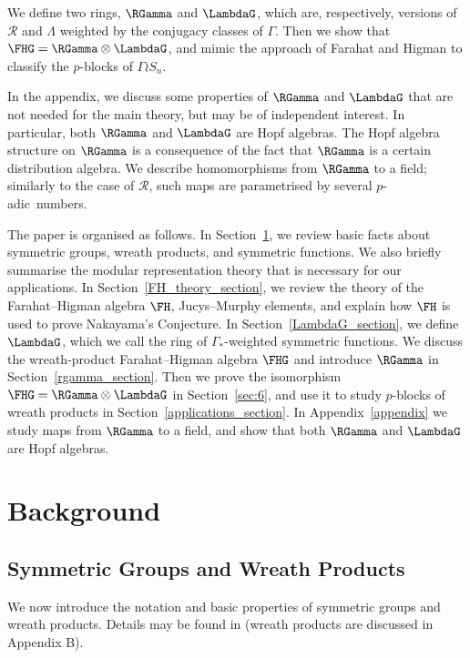 We define two rings, $\RGamma$ and $\LambdaG$, which are, respectively, versions of $\mathcal{R}$ and $\Lambda$ weighted by the conjugacy classes of $\Gamma$. Then we show that $\FHG = \RGamma \otimes \LambdaG$, and mimic the approach of Farahat and Higman to classify the $p$-blocks of $\Gamma \wr S_n$.  

In the appendix, we discuss some properties of $\RGamma$ and $\LambdaG$ that are not needed for the main theory, but may be of independent interest. In particular, both $\RGamma$ and $\LambdaG$ are Hopf algebras. The Hopf algebra structure on $\RGamma$ is a consequence of the fact that $\RGamma$ is a certain distribution algebra. We describe homomorphisms from $\RGamma$ to a field; similarly to the case of $\mathcal{R}$, such maps are parametrised by several $p$-adic~numbers.

The paper is organised as follows. In Section~\ref{sec:bg}, we review basic facts about symmetric groups, wreath products, and symmetric functions. 
We also briefly summarise the modular representation theory that is necessary for our applications.
In Section~\ref{FH_theory_section}, we review the theory of the Farahat--Higman algebra $\FH$, Jucys--Murphy elements, and explain how $\FH$ is used to prove Nakayama's Conjecture.
In Section~\ref{LambdaG_section}, we define $\LambdaG$, which we call the ring of $\Gamma_*$-weighted symmetric functions.
We discuss the wreath-product Farahat--Higman algebra $\FHG$ and introduce $\RGamma$ in Section~\ref{rgamma_section}.
Then we prove the isomorphism $\FHG = \RGamma \otimes \LambdaG$ in Section~\ref{sec:6}, and use it to study $p$-blocks of wreath products in Section~\ref{applications_section}. 
In  Appendix~\ref{appendix} we study maps from $\RGamma$ to a field, and show that both $\RGamma$ and $\LambdaG$ are Hopf algebras.

















\section{Background}
\label{sec:bg}
\subsection{Symmetric Groups and Wreath Products}
We now introduce the notation and basic properties of symmetric groups and  wreath products. Details may be found in \cite[Chapter 1]{Macdonald} (wreath products are discussed in Appendix B).

